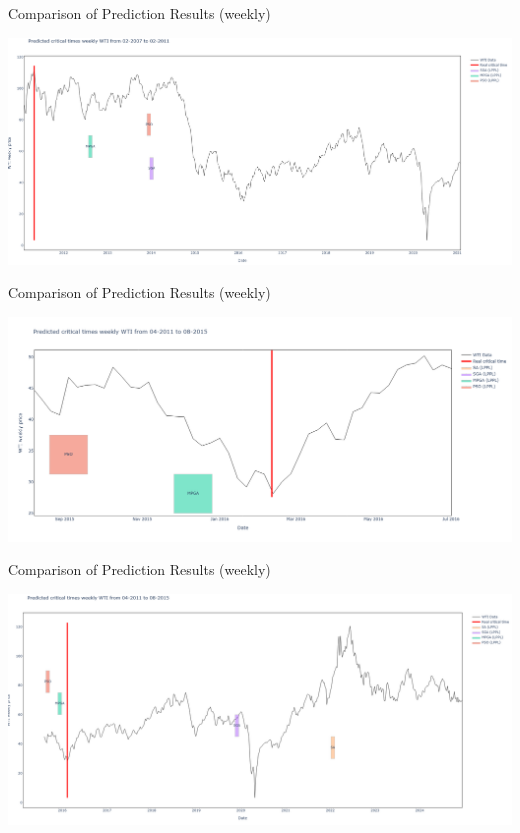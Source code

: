 \documentclass{beamer}
\begin{document}
\begin{frame}{Comparison of Prediction Results (weekly)}
    \begin{center}
        \includegraphics[width=\textwidth]{plot_overlead/weekly_WTI_2_all_price.png}
    \end{center}
\end{frame}

\begin{frame}{Comparison of Prediction Results (weekly)}
    \begin{center}
        \includegraphics[width=\textwidth]{plot_overlead/weekly_WTI_3.png}
    \end{center}
\end{frame}

\begin{frame}{Comparison of Prediction Results (weekly)}
    \begin{center}
        \includegraphics[width=\textwidth]{plot_overlead/weekly_WTI_3_all_price.png}
    \end{center}
\end{frame}
\end{document}
